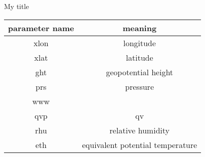 \documentclass[10pt,a4j,openany,dvipdfmx]{jsarticle}
\begin{document}
\begin{myfilebox}[colbacktitle=RoyalBlue]{My title}
\lipsum[2]
\end{myfilebox}


\begin{table}[H]
  \centering
  \begin{tabular}{|c|c|} \hline
      parameter name & meaning\\ \hline \hline
      xlon & longitude\\
      xlat & latitude\\
      ght  & geopotential height\\
      prs  & pressure\\
      www  & \\
      qvp  & qv\\
      rhu  & relative humidity\\ 
      eth  & equivalent potential temperature\\ \hline
  \end{tabular}
\end{table}


\end{document}
